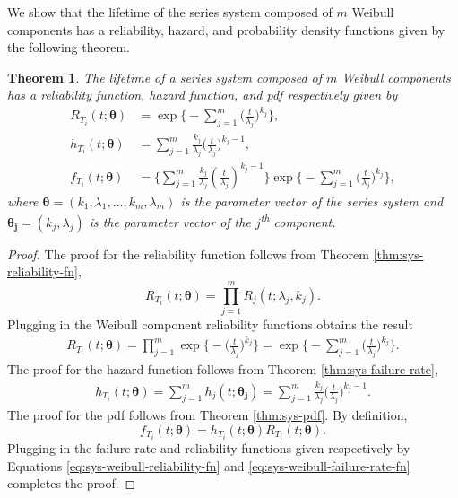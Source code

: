 \documentclass[
]{article}
\theoremstyle{definition}
\theoremstyle{plain}
\newtheorem{theorem}{Theorem}[section]
\theoremstyle{definition}
\theoremstyle{definition}
\theoremstyle{definition}
\theoremstyle{definition}
\theoremstyle{remark}
\begin{document}
We show that the lifetime of the series system composed of \(m\) Weibull
components has a reliability, hazard, and probability density functions given by
the following theorem.

\begin{theorem}
\protect\hypertarget{thm:sys_weibull}{}\label{thm:sys_weibull}The lifetime of a series system composed of \(m\) Weibull components
has a reliability function, hazard function, and pdf respectively given by
\begin{align}
\label{eq:sys-weibull-reliability-fn}
R_{T_i}(t;\boldsymbol{\theta}) &= \exp\biggl\{-\sum_{j=1}^{m}\biggl(\frac{t}{\lambda_j}\biggr)^{k_j}\biggr\},\\
\label{eq:sys-weibull-failure-rate-fn}
h_{T_i}(t;\boldsymbol{\theta}) &= \sum_{j=1}^{m} \frac{k_j}{\lambda_j}\biggl(\frac{t}{\lambda_j}\biggr)^{k_j-1},\\
\label{eq:sys-weibull-pdf}
f_{T_i}(t;\boldsymbol{\theta}) &= \biggl\{
    \sum_{j=1}^m \frac{k_j}{\lambda_j}\left(\frac{t}{\lambda_j}\right)^{k_j-1}
\biggr\}
\exp
\biggl\{
    -\sum_{j=1}^m \bigl(\frac{t}{\lambda_j}\bigr)^{k_j}
\biggr\},
\end{align}
where \(\boldsymbol{\theta }= (k_1, \lambda_1, \ldots, k_m, \lambda_m)\) is the parameter
vector of the series system and \(\boldsymbol{\theta_j} = (k_j, \lambda_j)\) is the
parameter vector of the \(j\)\textsuperscript{th} component.
\end{theorem}

\begin{proof}
The proof for the reliability function follows from Theorem \ref{thm:sys-reliability-fn},
\[
R_{T_i}(t;\boldsymbol{\theta}) = \prod_{j=1}^{m} R_j(t;\lambda_j,k_j).
\]
Plugging in the Weibull component reliability functions obtains the result
\begin{align*}
R_{T_i}(t;\boldsymbol{\theta})
    = \prod_{j=1}^{m} \exp\biggl\{-\biggl(\frac{t}{\lambda_j}\biggr)^{k_j}\biggr\}
    = \exp\biggl\{-\sum_{j=1}^{m}\biggl(\frac{t}{\lambda_j}\biggr)^{k_j}\biggr\}.
\end{align*}
The proof for the hazard function follows from Theorem \ref{thm:sys-failure-rate},
\begin{align*}
h_{T_i}(t;\boldsymbol{\theta})
    = \sum_{j=1}^{m} h_j(t;\boldsymbol{\theta_j})
    = \sum_{j=1}^{m} \frac{k_j}{\lambda_j}\biggl(\frac{t}{\lambda_j}\biggr)^{k_j-1}.
\end{align*}
The proof for the pdf follows from Theorem \ref{thm:sys-pdf}. By definition,
\[
f_{T_i}(t;\boldsymbol{\theta}) = h_{T_i}(t;\boldsymbol{\theta}) R_{T_i}(t;\boldsymbol{\theta}).
\]
Plugging in the failure rate and reliability functions given respectively by
Equations \eqref{eq:sys-weibull-reliability-fn} and
\eqref{eq:sys-weibull-failure-rate-fn} completes the proof.
\end{proof}
\end{document}
